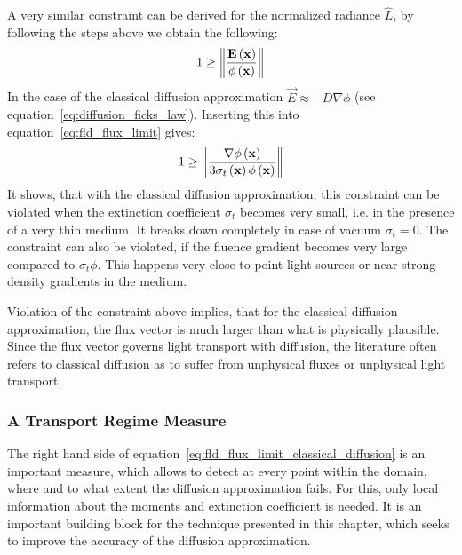 A very similar constraint can be derived for the normalized radiance $\widehat{L}$, by following the steps above we obtain the following:
\begin{align}
\label{eq:fld_flux_limit}
1
\ge
\left\lVert
\frac{\boldsymbol{\mathbf{E}}\left(\boldsymbol{\mathbf{x}}\right)}{\phi\left(\boldsymbol{\mathbf{x}}\right)}
\right\rVert
\end{align}
In the case of the classical diffusion approximation $\vec{E}\approx-D\nabla\phi$ (see equation~\ref{eq:diffusion_ficks_law}). Inserting this into equation~\ref{eq:fld_flux_limit} gives:
\begin{align}
\label{eq:fld_flux_limit_classical_diffusion}
1
\ge
\left\lVert
\frac{\nabla\phi\left(\boldsymbol{\mathbf{x}}\right)}{3\sigma_t\left(\boldsymbol{\mathbf{x}}\right)\phi\left(\boldsymbol{\mathbf{x}}\right)}
\right\rVert
\end{align}
It shows, that with the classical diffusion approximation, this constraint can be violated when the extinction coefficient $\sigma_t$ becomes very small, i.e. in the presence of a very thin medium. It breaks down completely in case of vacuum $\sigma_t=0$. The constraint can also be violated, if the fluence gradient becomes very large compared to $\sigma_t\phi$. This happens very close to point light sources or near strong density gradients in the medium.

Violation of the constraint above implies, that for the classical diffusion approximation, the flux vector is much larger than what is physically plausible. Since the flux vector governs light transport with diffusion, the literature often refers to classical diffusion as to suffer from unphysical fluxes or unphysical light transport.


\subsubsection*{A Transport Regime Measure}

The right hand side of equation~\ref{eq:fld_flux_limit_classical_diffusion} is an important measure, which allows to detect at every point within the domain, where and to what extent the diffusion approximation fails. For this, only local information about the moments and extinction coefficient is needed. It is an important building block for the technique presented in this chapter, which seeks to improve the accuracy of the diffusion approximation.

